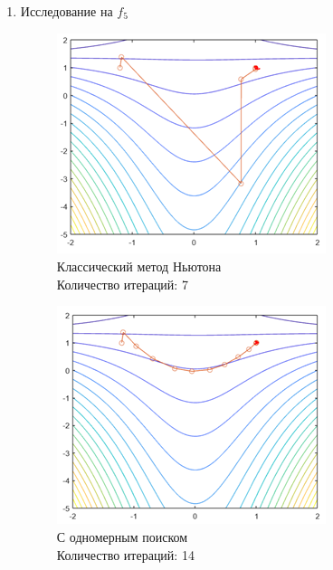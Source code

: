 \documentclass[12pt]{article}
\begin{document}
\begin{enumerate}
	\item Исследование на $f_5$

	\begin{figure}[H]
	\begin{minipage}{.5\textwidth}
    	\centering
    	\includegraphics[scale=0.75]{img/f4_1.png}
		\\ Классический метод Ньютона
		\\ Количество итераций: 7
	\end{minipage}
    \begin{minipage}{.5\textwidth}
    \centering
    	\includegraphics[scale=0.75]{img/f4_2.png}
    	\\ С одномерным поиском
    	\\ Количество итераций: 14
    \end{minipage}
    \end{figure}


\end{enumerate}
\end{document}
